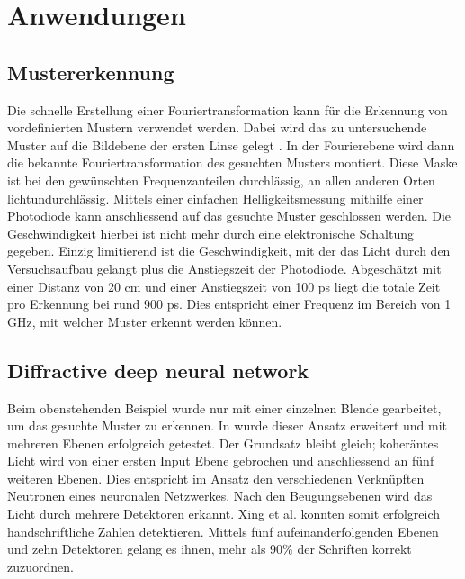 %
%
%
%
\section{Anwendungen 
\label{opt:section:anwendungen}}


\subsection{Mustererkennung}
Die schnelle Erstellung einer Fouriertransformation kann für die Erkennung von vordefinierten Mustern verwendet werden.
Dabei wird das zu untersuchende Muster auf die Bildebene der ersten Linse gelegt .
In der Fourierebene wird dann die bekannte Fouriertransformation des gesuchten Musters montiert.
Diese Maske ist bei den gewünschten Frequenzanteilen durchlässig, an allen anderen Orten lichtundurchlässig.
Mittels einer einfachen Helligkeitsmessung mithilfe einer Photodiode kann anschliessend auf das gesuchte Muster geschlossen werden.
\cite{opt:YT:PatternRecognition}
Die Geschwindigkeit hierbei ist nicht mehr durch eine elektronische Schaltung gegeben.
Einzig limitierend ist die Geschwindigkeit, mit der das Licht durch den Versuchsaufbau gelangt plus die Anstiegszeit der Photodiode.
Abgeschätzt mit einer Distanz von 20 cm und einer Anstiegszeit von 100 ps liegt die totale Zeit pro Erkennung bei rund 900 ps.
Dies entspricht einer Frequenz im Bereich von 1 GHz, mit welcher Muster erkennt werden können.

\subsection{Diffractive deep neural network}
Beim obenstehenden Beispiel wurde nur mit einer einzelnen Blende gearbeitet, um das gesuchte Muster zu erkennen.
In \cite{opt:Lin.2018} wurde dieser Ansatz erweitert und mit mehreren Ebenen erfolgreich getestet.
Der Grundsatz bleibt gleich; koheräntes Licht wird von einer ersten Input Ebene gebrochen und anschliessend an fünf weiteren Ebenen.
Dies entspricht im Ansatz den verschiedenen Verknüpften Neutronen eines neuronalen Netzwerkes.
Nach den Beugungsebenen wird das Licht durch mehrere Detektoren erkannt.
Xing et al. konnten somit erfolgreich handschriftliche Zahlen detektieren.
Mittels fünf aufeinanderfolgenden Ebenen und zehn Detektoren gelang es ihnen, mehr als 90\% der Schriften korrekt zuzuordnen.


